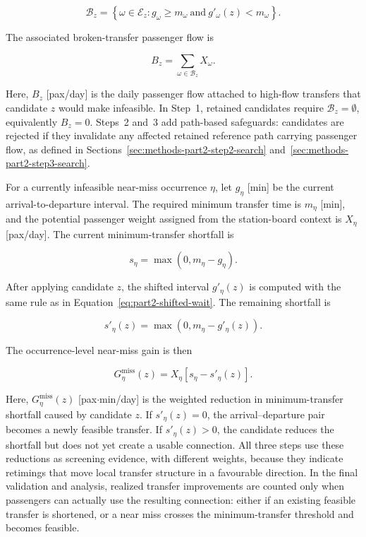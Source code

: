 \documentclass[preprint,12pt]{elsarticle}
\begin{document}
\begin{equation}
\mathcal{B}_z
=
\left\{
\omega\in\mathcal{E}_z:
g_\omega\ge m_\omega
\ \text{and}\
g'_\omega(z)<m_\omega
\right\}.
\label{eq:part2-broken-transfer-set}
\end{equation}

The associated broken-transfer passenger flow is

\begin{equation}
B_z
=
\sum_{\omega\in\mathcal{B}_z}
X_\omega .
\label{eq:part2-broken-transfer-flow}
\end{equation}

Here, \(B_z\) [pax/day] is the daily passenger flow attached to high-flow transfers that candidate \(z\) would make infeasible. In Step~1, retained candidates require \(\mathcal{B}_z=\emptyset\), equivalently \(B_z=0\). Steps~2 and~3 add path-based safeguards: candidates are rejected if they invalidate any affected retained reference path carrying passenger flow, as defined in Sections~\ref{sec:methods-part2-step2-search} and~\ref{sec:methods-part2-step3-search}.

For a currently infeasible near-miss occurrence \(\eta\), let \(g_\eta\) [min] be the current arrival-to-departure interval. The required minimum transfer time is \(m_\eta\) [min], and the potential passenger weight assigned from the station-board context is \(X_\eta\) [pax/day]. The current minimum-transfer shortfall is

\begin{equation}
s_\eta
=
\max(0,m_\eta-g_\eta).
\label{eq:part2-near-miss-shortfall}
\end{equation}

After applying candidate \(z\), the shifted interval \(g'_\eta(z)\) is computed with the same rule as in Equation~\eqref{eq:part2-shifted-wait}. The remaining shortfall is

\begin{equation}
s'_\eta(z)
=
\max(0,m_\eta-g'_\eta(z)).
\label{eq:part2-shifted-near-miss-shortfall}
\end{equation}

The occurrence-level near-miss gain is then

\begin{equation}
G_\eta^{\mathrm{miss}}(z)
=
X_\eta
\left[
s_\eta-s'_\eta(z)
\right].
\label{eq:part2-near-miss-gain}
\end{equation}

Here, \(G_\eta^{\mathrm{miss}}(z)\) [pax\(\cdot\)min/day] is the weighted reduction in minimum-transfer shortfall caused by candidate \(z\). If \(s'_\eta(z)=0\), the arrival--departure pair becomes a newly feasible transfer. If \(s'_\eta(z)>0\), the candidate reduces the shortfall but does not yet create a usable connection. All three steps use these reductions as screening evidence, with different weights, because they indicate retimings that move local transfer structure in a favourable direction. In the final validation and analysis, realized transfer improvements are counted only when passengers can actually use the resulting connection: either if an existing feasible transfer is shortened, or a near miss crosses the minimum-transfer threshold and becomes feasible.
\end{document}
